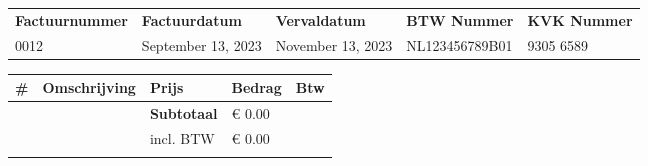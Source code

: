 \documentclass{article}%
\begin{document}
\begin{minipage}{\textwidth}%
\flushleft%
\begin{tabularx}{\textwidth}{XXXXX}%
\textbf{Factuurnummer}&\textbf{Factuurdatum}&\textbf{Vervaldatum}&\textbf{BTW Nummer}&\textbf{KVK Nummer}\\%
0012&September 13, 2023&November 13, 2023&NL123456789B01&9305 6589\\%
\end{tabularx}%
\linebreak%
\linebreak%
\linebreak%
\linebreak%
\begin{tabularx}{\textwidth}{lXlll}%
\textbf{\#}&\textbf{Omschrijving}&\textbf{Prijs}&\textbf{Bedrag}&\textbf{Btw}\\%
\hline%
&&\textbf{Subtotaal}&€ 0.00&\\%
&&incl. BTW&€ 0.00 \\ \cline{3-4}&\\%
\end{tabularx}%
\end{minipage}%
\end{document}
